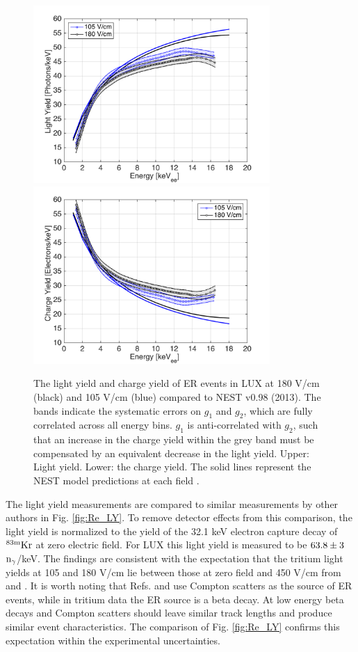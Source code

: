 \begin{figure}[h!]\centering
\includegraphics[width=90mm]{fig/ER_LY.png}
\includegraphics[width=90mm]{fig/ER_QY.png}
\caption{The light yield and charge yield of ER events in LUX at 180 V/cm (black) and 105 V/cm (blue) compared to NEST v0.98 (2013). The bands indicate the systematic errors on $g_1$ and $g_2$, which are fully correlated across all energy bins. $g_1$ is anti-correlated with $g_2$, such that an increase in the charge yield within the grey band must be compensated by an equivalent decrease in the light yield. Upper: Light yield. Lower: the charge yield. The solid lines represent the NEST model predictions at each field \cite{NEST_2013}.}
\label{fig:ER-LY-QY}
\end{figure}

The light yield measurements are compared to similar measurements by other authors in Fig. \ref{fig:Re_LY}. To remove detector effects from this comparison, the light yield is normalized to the yield of the 32.1 keV electron capture decay of $\rm ^{83m}Kr$ at zero electric field. For LUX this light yield is measured to be $\rm 63.8 \pm 3$ $\rm n_\gamma$/keV. The findings are consistent with the expectation that the tritium light yields at 105 and 180 V/cm lie between those at zero field and 450 V/cm from \cite{Aprile_LY} and \cite{Baudis}. It is worth noting that Refs. \cite{Aprile_LY} and \cite{Baudis} use Compton scatters as the source of ER events, while in tritium data the ER source is a beta decay. At low energy beta decays and Compton scatters should leave similar track lengths and produce similar event characteristics. The comparison of Fig. \ref{fig:Re_LY} confirms this expectation within the experimental uncertainties.

